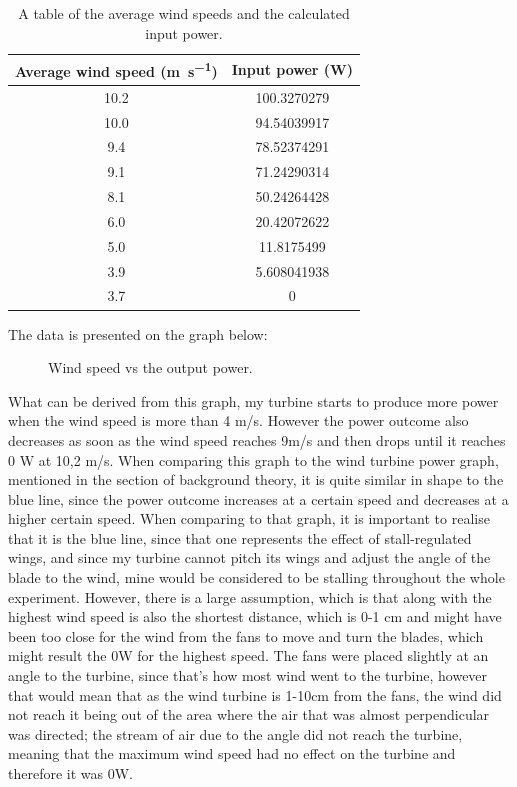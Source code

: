 \documentclass[12pt]{article}
\begin{document}
\begin{table}
  \centering
  \begin{tabular}{@{}cc@{}} \toprule
    Average wind speed (\si{\metre\per\second}) & Input power (\si{\watt}) \\ \midrule
    10.2 & 100.3270279 \\
    10.0 & 94.54039917 \\
    9.4 & 78.52374291 \\
    9.1 & 71.24290314 \\
    8.1 & 50.24264428 \\
    6.0 & 20.42072622 \\
    5.0 & 11.8175499 \\
    3.9 & 5.608041938 \\
    3.7 & 0 \\ \bottomrule
\end{tabular}
\caption{A table of the average wind speeds and the calculated input power.}
\label{table:WindSpeedVsPower}
\end{table}

The data is presented on the graph below:

\begin{figure}
  \centering
  \caption{Wind speed vs the output power.}
  \label{figure:final}
\end{figure}

What can be derived from this graph, my turbine starts to produce more power when the wind speed is more than 4 m/s.
However the power outcome also decreases as soon as the wind speed reaches 9m/s and then drops until it reaches 0 W at 10,2 m/s.
When comparing this graph to the wind turbine power graph, mentioned in the section of background theory, it is quite similar in shape to the blue line, since the power outcome increases at a certain speed and decreases at a higher certain speed.
When comparing to that graph, it is important to realise that it is the blue line, since that one represents the effect of stall-regulated wings, and since my turbine cannot pitch its wings and adjust the angle of the blade to the wind, mine would be considered to be stalling throughout the whole experiment.
However, there is a large assumption, which is that along with the highest wind speed is also the shortest distance, which is 0-1 cm and might have been too close for the wind from the fans to move and turn the blades, which might result the 0W for the highest speed.
The fans were placed slightly at an angle to the turbine, since that's how most wind went to the turbine, however that would mean that as the wind turbine is 1-10cm from the fans, the wind did not reach it being out of the area where the air that was almost perpendicular was directed; the stream of air due to the angle did not reach the turbine, meaning that the maximum wind speed had no effect on the turbine and therefore it was 0W.
\end{document}
